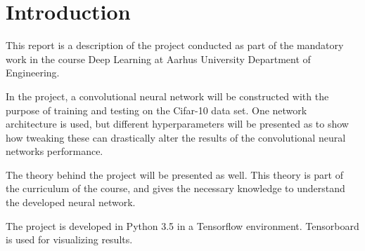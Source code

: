 \chapter{Introduction}
\label{chp:intro}

This report is a description of the project conducted as part of the mandatory work in the course Deep Learning at Aarhus University Department of Engineering.

In the project, a convolutional neural network will be constructed with the purpose of training and testing on the Cifar-10 data set. One network architecture is used, but different hyperparameters will be presented as to show how tweaking these can drastically alter the results of the convolutional neural networks performance. 

The theory behind the project will be presented as well. This theory is part of the curriculum of the course, and gives the necessary knowledge to understand the developed neural network. 

The project is developed in Python 3.5 in a Tensorflow environment. Tensorboard is used for visualizing results. 